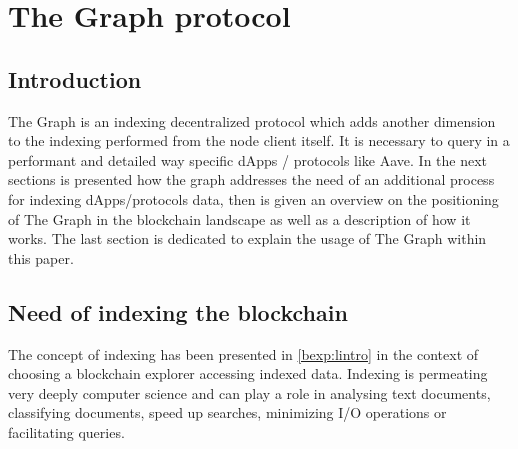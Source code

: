 \documentclass[11pt,a4paper,titlepage]{scrartcl}
\begin{document}
\newpage



\section{The Graph protocol}

\subsection{Introduction}

The Graph is an indexing decentralized protocol which adds another dimension to the indexing performed from the node client itself. It is necessary to query in a performant and detailed way specific dApps / protocols like Aave.  In the next sections is presented how the graph addresses the need of an additional process for indexing dApps/protocols data, then is given an overview on the positioning of The Graph in the blockchain landscape  as well as a description of how it works. The last section is dedicated to explain the usage of  The Graph within this paper.


\subsection{Need of indexing the blockchain}

The concept of indexing has been presented  in \ref{bexp:lintro}  in the context of choosing a blockchain explorer accessing indexed data. Indexing is permeating very deeply computer science and can play a role in analysing text documents, classifying documents, speed up searches, minimizing I/O operations or facilitating queries. 
\end{document}
